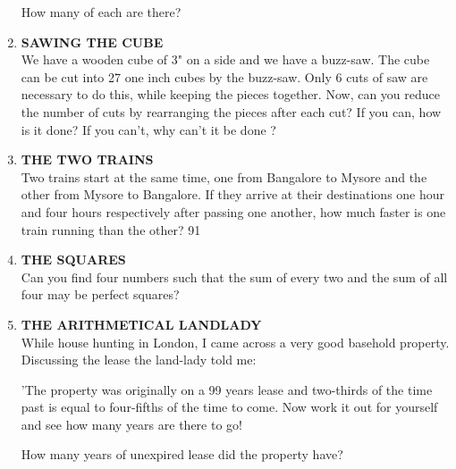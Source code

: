 \documentclass[12pt]{article}
\begin{document}
\begin{enumerate}
How  many  of each  are there? 


\item \textbf{SAWING  THE  CUBE} \\ 
We have  a wooden  cube  of 3" on a side  and  we  have a buzz-saw.  The  cube  can be cut into  27 one  inch  cubes by the buzz-saw.  Only  6 cuts  of saw are necessary  to do this, while  keeping  the  pieces  together.  Now,  can  you reduce  the number  of cuts  by rearranging  the pieces  after each cut?  If you can,  how  is it done?  If you  can't, why can't  it be done  ? 


\item \textbf{THE  TWO  TRAINS} \\
Two trains  start  at the same  time,  one  from  Bangalore to Mysore  and the other  from  Mysore  to Bangalore.  If they arrive  at their  destinations  one hour  and  four  hours respectively  after  passing  one another,  how  much  faster  is one train  running  than  the other? 
91 

\item \textbf{THE  SQUARES} \\
Can you find  four  numbers  such  that  the  sum  of every two and the sum  of all four  may  be perfect  squares? 


\item \textbf{THE  ARITHMETICAL  LANDLADY} \\
While  house  hunting  in London,  I came  across  a very good  basehold  property.  Discussing  the lease  the  land-lady told  me: 

'The property  was  originally  on a 99 years  lease  and two-thirds  of the time  past  is equal  to four-fifths  of the time to come.  Now  work  it out for yourself  and see how many  years  are there  to go!

How  many  years  of unexpired  lease  did  the property have? 
\end{enumerate}
\end{document}
